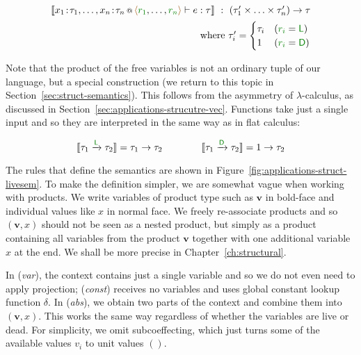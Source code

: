 \begin{equation*}
\begin{array}{r}
\\[-0.5em]
\sem{\coctx{x_1\!:\!\tau_1, \ldots, x_n\!:\!\tau_n}{ \alift{\cclrd{r_1}, \ldots, \cclrd{r_n}} } \vdash e : \tau}
  ~:~ (\tau'_1 \times \ldots \times \tau'_n) \rightarrow \tau\\[0.5em]
\textnormal{where}~\tau'_i = \begin{cases}
\tau_i & (\cclrd{r_i} = \cclrd{\cclrd{\ident{L}}})\\
1      & (\cclrd{r_i} = \cclrd{\cclrd{\ident{D}}})
\end{cases}
\end{array}
\end{equation*}
\vspace{0.5em}

\noindent
Note that the product of the free variables is not an ordinary tuple of our language, but a special
construction (we return to this topic in Section~\ref{sec:struct-semantics}). This follows from the
asymmetry of $\lambda$-calculus, as discussed in Section~\ref{sec:applications-strucutre-vec}. Functions
take just a single input and so they are interpreted in the same way as in flat calculus:

\vspace{-0.5em}
\begin{equation*}
\sem{\tau_1 \xrightarrow{\aclrd{\cclrd{\ident{L}}}} \tau_2} = \tau_1 \rightarrow \tau_2 \qquad\qquad
\sem{\tau_1 \xrightarrow{\aclrd{\cclrd{\ident{D}}}} \tau_2} = 1 \rightarrow \tau_2
\end{equation*}
\vspace{-0.5em}

\noindent
The rules that define the semantics are shown in Figure~\ref{fig:applications-struct-livesem}.
To make the definition simpler, we are somewhat vague when working with products. We write
variables of product type such as $\mathbf{v}$ in bold-face and individual values like $x$ in
normal face. We freely re-associate products and so $(\mathbf{v}, x)$ should not be seen as a
nested product, but simply as a product containing all variables from the product $\mathbf{v}$
together with one additional variable $x$ at the end. We shall be more precise in
Chapter~\ref{ch:structural}.

In (\emph{var}), the context contains just a single variable and so we do not even need to apply
projection; (\emph{const}) receives no variables and uses global constant lookup function $\delta$.
In (\emph{abs}), we obtain two parts of the context and combine them into $(\mathbf{v}, x)$. This
works the same way regardless of whether the variables are live or dead. For simplicity, we omit
subcoeffecting, which just turns some of the available values $v_i$ to unit values $()$.

